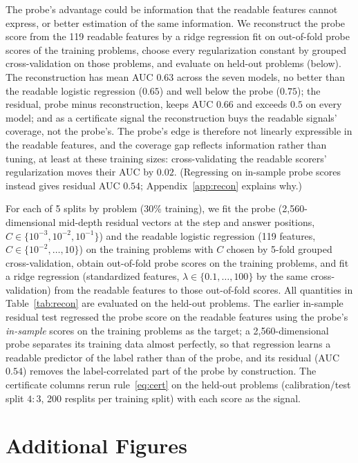 The probe's advantage could be information that the readable features cannot express, or better estimation of the same information. We reconstruct the probe score from the 119 readable features by a ridge regression fit on out-of-fold probe scores of the training problems, choose every regularization constant by grouped cross-validation on those problems, and evaluate on held-out problems (below). The reconstruction has mean AUC $0.63$ across the seven models, no better than the readable logistic regression ($0.65$) and well below the probe ($0.75$); the residual, probe minus reconstruction, keeps AUC $0.66$ and exceeds $0.5$ on every model; and as a certificate signal the reconstruction buys the readable signals' coverage, not the probe's. The probe's edge is therefore not linearly expressible in the readable features, and the coverage gap reflects information rather than tuning, at least at these training sizes: cross-validating the readable scorers' regularization moves their AUC by $0.02$. (Regressing on in-sample probe scores instead gives residual AUC $0.54$; Appendix~\ref{app:recon} explains why.)

For each of 5 splits by problem (30\% training), we fit the probe (2{,}560-dimensional mid-depth residual vectors at the step and answer positions, $C\in\{10^{-3},10^{-2},10^{-1}\}$) and the readable logistic regression (119 features, $C\in\{10^{-2},\dots,10\}$) on the training problems with $C$ chosen by 5-fold grouped cross-validation, obtain out-of-fold probe scores on the training problems, and fit a ridge regression (standardized features, $\lambda\in\{0.1,\dots,100\}$ by the same cross-validation) from the readable features to those out-of-fold scores. All quantities in Table~\ref{tab:recon} are evaluated on the held-out problems. The earlier in-sample residual test regressed the probe score on the readable features using the probe's \emph{in-sample} scores on the training problems as the target; a 2{,}560-dimensional probe separates its training data almost perfectly, so that regression learns a readable predictor of the label rather than of the probe, and its residual (AUC $0.54$) removes the label-correlated part of the probe by construction. The certificate columns rerun rule~\eqref{eq:cert} on the held-out problems (calibration/test split $4{:}3$, 200 resplits per training split) with each score as the signal.



\clearpage
\section{Additional Figures}
\label{app:figs}

